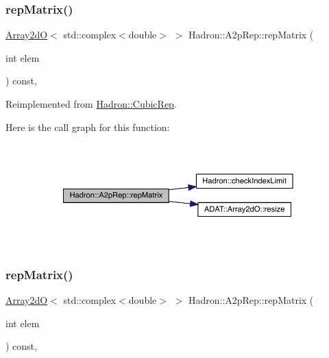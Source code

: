 \subsubsection{\texorpdfstring{repMatrix()}{repMatrix()}\hspace{0.1cm}{\footnotesize\ttfamily [1/3]}}
{\footnotesize\ttfamily \mbox{\hyperlink{classADAT_1_1Array2dO}{Array2dO}}$<$ std\+::complex$<$double$>$ $>$ Hadron\+::\+A2p\+Rep\+::rep\+Matrix (\begin{DoxyParamCaption}\item[{int}]{elem }\end{DoxyParamCaption}) const\hspace{0.3cm}{\ttfamily [inline]}, {\ttfamily [virtual]}}



Reimplemented from \mbox{\hyperlink{structHadron_1_1CubicRep_ac5d7e9e6f4ab1158b5fce3e4ad9e8005}{Hadron\+::\+Cubic\+Rep}}.

Here is the call graph for this function\+:
\nopagebreak
\begin{figure}[H]
\begin{center}
\leavevmode
\includegraphics[width=350pt]{d4/d33/structHadron_1_1A2pRep_aeede31465f59cff568c2ada0aa32ac37_cgraph}
\end{center}
\end{figure}
\mbox{\label{structHadron_1_1A2pRep_aeede31465f59cff568c2ada0aa32ac37}} 
\subsubsection{\texorpdfstring{repMatrix()}{repMatrix()}\hspace{0.1cm}{\footnotesize\ttfamily [2/3]}}
{\footnotesize\ttfamily \mbox{\hyperlink{classADAT_1_1Array2dO}{Array2dO}}$<$ std\+::complex$<$double$>$ $>$ Hadron\+::\+A2p\+Rep\+::rep\+Matrix (\begin{DoxyParamCaption}\item[{int}]{elem }\end{DoxyParamCaption}) const\hspace{0.3cm}{\ttfamily [inline]}, {\ttfamily [virtual]}}



